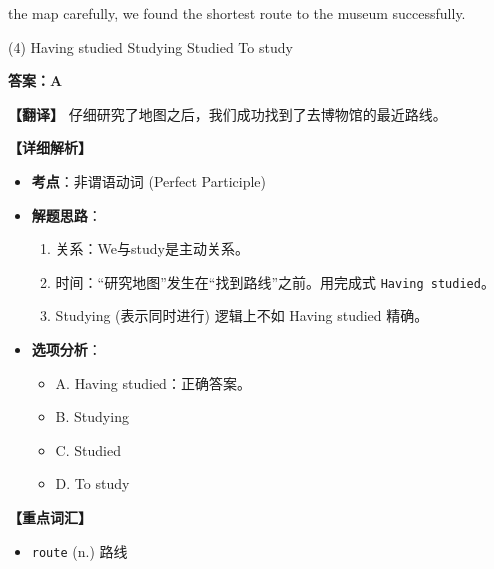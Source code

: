 \documentclass[11pt, a4paper]{article}
\newcommand{\analysis}[4]{
    \begin{solutionbox}
        \textbf{答案：#1}
        
        \textbf{【翻译】} #2
        
        \textbf{【详细解析】}
        #3
        
        \textbf{【重点词汇】}
        #4
    \end{solutionbox}
}
\newcommand{\blank}{\underline{\hspace{1.5cm}}}
\begin{document}
\begin{questions}
    \item \blank the map carefully, we found the shortest route to the museum successfully.
    \begin{tasks}(4)
        \task Having studied \task Studying \task Studied \task To study
    \end{tasks}
    \analysis{A}{仔细研究了地图之后，我们成功找到了去博物馆的最近路线。}{
        \begin{itemize}
            \item \textbf{考点}：非谓语动词 (Perfect Participle)
            \item \textbf{解题思路}：
                \begin{enumerate}
                    \item 关系：We与study是主动关系。
                    \item 时间：“研究地图”发生在“找到路线”之前。用完成式 \texttt{Having studied}。
                    \item Studying (表示同时进行) 逻辑上不如 Having studied 精确。
                \end{enumerate}
            \item \textbf{选项分析}：
                \begin{itemize}
                    \item A. Having studied：正确答案。
                    \item B. Studying
                    \item C. Studied
                    \item D. To study
                \end{itemize}
        \end{itemize}
    }{
        \begin{itemize}
            \item \texttt{route} (n.) 路线
        \end{itemize}
    }


\end{questions}
\end{document}

